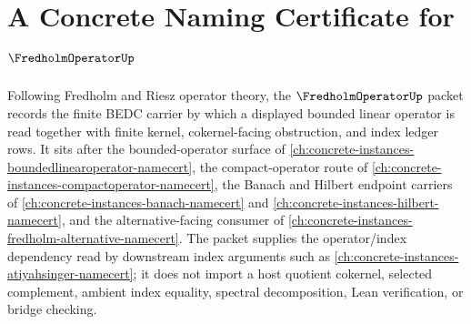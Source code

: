 \chapter{A Concrete Naming Certificate for $\FredholmOperatorUp$}
\label{ch:concrete-instances-fredholm-operator-namecert}

Following Fredholm and Riesz operator theory, the $\FredholmOperatorUp$ packet records the finite BEDC carrier by which a displayed bounded linear operator is read together with finite kernel, cokernel-facing obstruction, and index ledger rows. It sits after the bounded-operator surface of \autoref{ch:concrete-instances-boundedlinearoperator-namecert}, the compact-operator route of \autoref{ch:concrete-instances-compactoperator-namecert}, the Banach and Hilbert endpoint carriers of \autoref{ch:concrete-instances-banach-namecert} and \autoref{ch:concrete-instances-hilbert-namecert}, and the alternative-facing consumer of \autoref{ch:concrete-instances-fredholm-alternative-namecert}. The packet supplies the operator/index dependency read by downstream index arguments such as \autoref{ch:concrete-instances-atiyahsinger-namecert}; it does not import a host quotient cokernel, selected complement, ambient index equality, spectral decomposition, Lean verification, or bridge checking.

